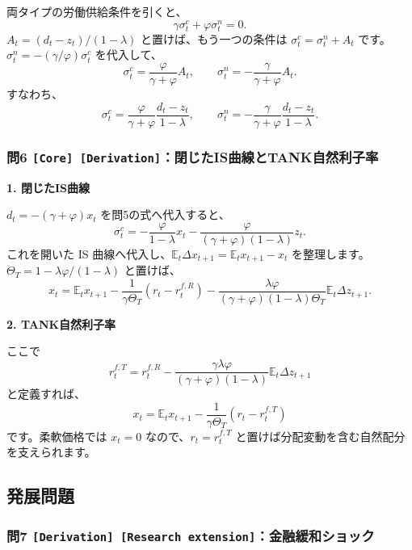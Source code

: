 \documentclass[
  japanese,
  lualatex,
  ja=standard,
  11pt,
  a4paper]{ltjsarticle}
\begin{document}
両タイプの労働供給条件を引くと、 \[
\gamma\sigma_t^c+\varphi\sigma_t^n=0.
\] \(A_t=(d_t-z_t)/(1-\lambda)\) と置けば、もう一つの条件は
\(\sigma_t^c=\sigma_t^n+A_t\)
です。\(\sigma_t^n=-(\gamma/\varphi)\sigma_t^c\) を代入して、 \[
\sigma_t^c=\frac{\varphi}{\gamma+\varphi}A_t,
\qquad
\sigma_t^n=-\frac{\gamma}{\gamma+\varphi}A_t.
\] すなわち、 \[
\sigma_t^c
=\frac{\varphi}{\gamma+\varphi}\frac{d_t-z_t}{1-\lambda},
\qquad
\sigma_t^n
=-\frac{\gamma}{\gamma+\varphi}\frac{d_t-z_t}{1-\lambda}.
\]

\subsubsection{\texorpdfstring{問6
\texttt{{[}Core{]}\ {[}Derivation{]}}：閉じたIS曲線とTANK自然利子率}{問6 {[}Core{]} {[}Derivation{]}：閉じたIS曲線とTANK自然利子率}}\label{ux554f6-core-derivationux9589ux3058ux305fisux66f2ux7ddaux3068tankux81eaux7136ux5229ux5b50ux7387}

\textbf{1. 閉じたIS曲線}

\(d_t=-(\gamma+\varphi)x_t\) を問5の式へ代入すると、 \[
\sigma_t^c
=-\frac{\varphi}{1-\lambda}x_t
-\frac{\varphi}{(\gamma+\varphi)(1-\lambda)}z_t.
\] これを開いた IS
曲線へ代入し、\(\mathbb E_t\Delta x_{t+1}=\mathbb E_tx_{t+1}-x_t\)
を整理します。\(\Theta_T=1-\lambda\varphi/(1-\lambda)\) と置けば、 \[
x_t=\mathbb E_tx_{t+1}
-\frac{1}{\gamma\Theta_T}(r_t-r_t^{f,R})
-\frac{\lambda\varphi}
{(\gamma+\varphi)(1-\lambda)\Theta_T}
\mathbb E_t\Delta z_{t+1}.
\]

\textbf{2. TANK自然利子率}

ここで \[
r_t^{f,T}=r_t^{f,R}
-\frac{\gamma\lambda\varphi}
{(\gamma+\varphi)(1-\lambda)}
\mathbb E_t\Delta z_{t+1}
\] と定義すれば、 \[
x_t=\mathbb E_tx_{t+1}
-\frac{1}{\gamma\Theta_T}(r_t-r_t^{f,T})
\] です。柔軟価格では \(x_t=0\) なので、\(r_t=r_t^{f,T}\)
と置けば分配変動を含む自然配分を支えられます。

\subsection{発展問題}\label{ux767aux5c55ux554fux984c-10}

\subsubsection{\texorpdfstring{問7
\texttt{{[}Derivation{]}\ {[}Research\ extension{]}}：金融緩和ショック}{問7 {[}Derivation{]} {[}Research extension{]}：金融緩和ショック}}\label{ux554f7-derivation-research-extensionux91d1ux878dux7de9ux548cux30b7ux30e7ux30c3ux30af}
\end{document}
